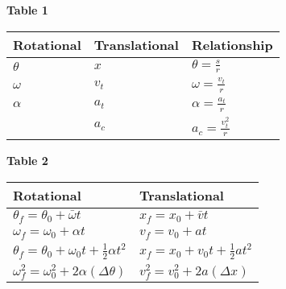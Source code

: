 \documentclass[a4paper]{article}
\let\bf\textbf
\begin{document}
\begin{center}
    \begin{minipage}{0.4\textwidth}
        \bf{Table 1}\vspace{2mm}\\
        \begin{tabularx}{1\textwidth}{ 
            | >{\raggedright\arraybackslash}X
            | >{\raggedright\arraybackslash}X  
            | >{\raggedright\arraybackslash}X |
        }
            \hline
            Rotational & Translational & Relationship\\[2.5pt]
            \hline
            $\theta$ & $x$ & $\theta = \frac{s}{r}$\\[2.5pt]
            \hline
            $\omega$ & $v_t$ & $\omega = \frac{v_t}{r}$\\[2.5pt]
            \hline
            $\alpha$ & $a_t$ & $\alpha = \frac{a_t}{r}$\\[2.5pt]
            \hline
            & $a_c$ & $a_c = \frac{v_t^2}{r}$\\[2.5pt]
            \hline
        \end{tabularx}
    \end{minipage}
    \hspace{10mm}
    \begin{minipage}{0.4\textwidth}
        \bf{Table 2}\vspace{2mm}\\
        \begin{tabularx}{1\textwidth}{
            | >{\raggedright\arraybackslash}X
            | >{\raggedright\arraybackslash}X |
        }
            \hline
            Rotational & Translational\\[2.75pt]
            \hline
            $\theta_f = \theta_0 + \bar{\omega}t$ & $x_f = x_0 + \bar{v}t$\\[2.75pt]
            \hline
            $\omega_f = \omega_0 + \alpha t$ & $v_f = v_0 + at$\\[2.75pt]
            \hline
            $\theta_f = \theta_0 + \omega_0t + \frac{1}{2}\alpha t^2$ & $x_f = x_0 + v_0t + \frac{1}{2}at^2$\\[2.75pt]
            \hline
            $\omega^2_f = \omega^2_0 + 2\alpha(\Delta\theta)$ & $v^2_f = v^2_0 + 2a(\Delta x)$\\[2.75pt]
            \hline
        \end{tabularx}
    \end{minipage}
\end{center}
\end{document}
